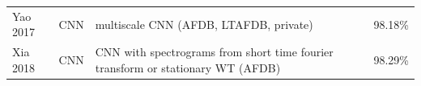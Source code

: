 \documentclass[journal]{IEEEtran}
\begin{document}
\begin{table}[!t]
\begin{minipage}{\textwidth}
\begin{tabularx}{\textwidth}{l c l l}
			Yao 2017\cite{yao2017atrial}                   & CNN            & multiscale CNN (AFDB, LTAFDB, private)                                                                     & 98.18\%                                                                                                                                                                                                                                                                                                                                                                                                                                                                                                                                                                                                                                                                                                                                                                                                                                                                                                  \\
			Xia 2018\cite{xia2018detecting}                & CNN            & CNN with spectrograms from short time fourier transform or stationary WT (AFDB)                            & 98.29\%                                                                                                                                                                                                                                                                                                                                                                                                                                                                                                                                                                                                                                                                                                                                                                                                                                                                                                  \\

\end{tabularx}
\end{minipage}
\end{table}
\end{document}
